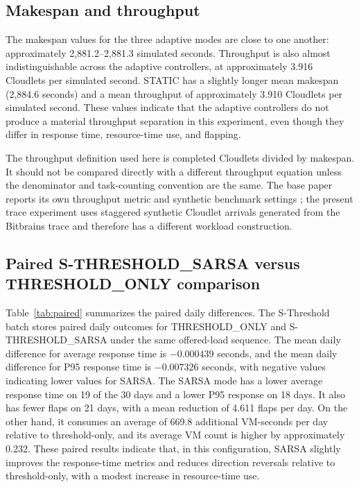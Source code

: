 \documentclass[pdflatex,sn-mathphys-num]{sn-jnl}
\begin{document}
\subsection{Makespan and throughput}

The makespan values for the three adaptive modes are close to one another: approximately 2,881.2--2,881.3 simulated seconds. Throughput is also almost indistinguishable across the adaptive controllers, at approximately 3.916 Cloudlets per simulated second. STATIC has a slightly longer mean makespan (2,884.6 seconds) and a mean throughput of approximately 3.910 Cloudlets per simulated second. These values indicate that the adaptive controllers do not produce a material throughput separation in this experiment, even though they differ in response time, resource-time use, and flapping.

The throughput definition used here is completed Cloudlets divided by makespan. It should not be compared directly with a different throughput equation unless the denominator and task-counting convention are the same. The base paper reports its own throughput metric and synthetic benchmark settings \cite{archana2025sthreshold}; the present trace experiment uses staggered synthetic Cloudlet arrivals generated from the Bitbrains trace and therefore has a different workload construction.

\subsection{Paired S-THRESHOLD\_SARSA versus THRESHOLD\_ONLY comparison}

Table~\ref{tab:paired} summarizes the paired daily differences. The S-Threshold batch stores paired daily outcomes for THRESHOLD\_ONLY and S-THRESHOLD\_SARSA under the same offered-load sequence. The mean daily difference for average response time is $-0.000439$ seconds, and the mean daily difference for P95 response time is $-0.007326$ seconds, with negative values indicating lower values for SARSA. The SARSA mode has a lower average response time on 19 of the 30 days and a lower P95 response on 18 days. It also has fewer flaps on 21 days, with a mean reduction of 4.611 flaps per day. On the other hand, it consumes an average of 669.8 additional VM-seconds per day relative to threshold-only, and its average VM count is higher by approximately 0.232. These paired results indicate that, in this configuration, SARSA slightly improves the response-time metrics and reduces direction reversals relative to threshold-only, with a modest increase in resource-time use.
\end{document}
